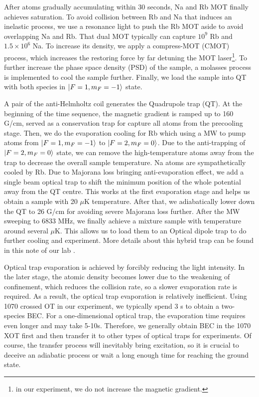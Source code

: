 After atoms gradually accumulating within 30 seconds, Na and Rb MOT finally achieves saturation. To avoid collision between Rb and Na that induces an inelastic process, we use a resonance light to push the Rb MOT aside to avoid overlapping Na and Rb. That dual MOT typically can capture $10^{9}$ Rb and $1.5 \times 10^{6}$ Na. To increase its density, we apply a compress-MOT (CMOT) process, which increases the restoring force by far detuning the MOT laser\footnote{in our experiment, we do not increase the magnetic gradient.}. To further increase the phase space density (PSD) of the sample, a molasses process is implemented to cool the sample further. Finally, we load the sample into QT with both species in $\ket{F=1,m_F=-1}$ state.

A pair of the anti-Helmholtz coil generates the Quadrupole trap (QT). At the beginning of the time sequence, the magnetic gradient is ramped up to 160 G/cm, served as a conservation trap for capture all atoms from the precooling stage. Then, we do the evaporation cooling for Rb which using a MW to pump atoms from $\ket{F=1,m_F=-1}$ to $\ket{F=2,m_F=0}$. Due to the anti-trapping of $\ket{F=2,m_F=0}$ state, we can remove the high-temperature atoms away from the trap to decrease the overall sample temperature. Na atoms are sympathetically cooled by Rb. Due to Majorana loss bringing anti-evaporation effect, we add a single beam optical trap to shift the minimum position of the whole potential away from the QT centre. This works at the first evaporation stage and helps us obtain a sample with 20 $\mu$K temperature. After that, we adiabatically lower down the QT to 26 G/cm for avoiding severe Majorana loss further. After the MW sweeping to 6833 MHz, we finally achieve a mixture sample with temperature around several $\mu$K. This allows us to load them to an Optical dipole trap to do further cooling and experiment. More details about this hybrid trap can be found in this note of our lab \cite{xiong2013production}.

Optical trap evaporation is achieved by forcibly reducing the light intensity. In the later stage, the atomic density becomes lower due to the weakening of confinement, which reduces the collision rate, so a slower evaporation rate is required. As a result, the optical trap evaporation is relatively inefficient. Using 1070 crossed OT in our experiment, we typically spend 3 s to obtain a two-species BEC. For a one-dimensional optical trap, the evaporation time requires even longer and may take 5-10s. Therefore, we generally obtain BEC in the 1070 XOT first and then transfer it to other types of optical traps for experiments. Of course, the transfer process will inevitably bring excitation, so it is crucial to deceive an adiabatic process or wait a long enough time for reaching the ground state.

